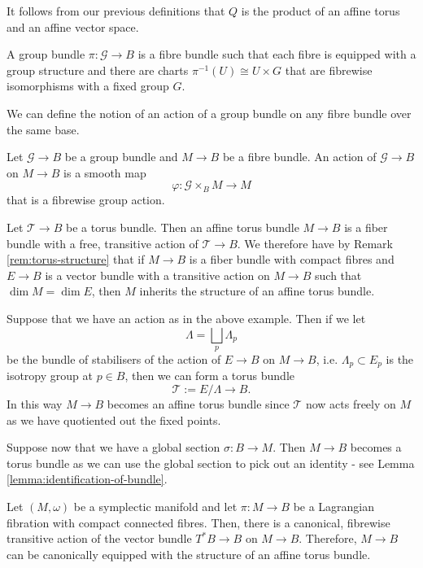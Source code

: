 \begin{remark}
    It follows from our previous definitions that $Q$ is the product of an affine torus and an affine vector space.
\end{remark}

\begin{definition}
    A group bundle $\pi : \mathcal{G} \to B$ is a fibre bundle such that each fibre is equipped with a group structure and there are charts
    $\pi^{-1}(U) \cong U \times G$ that are fibrewise isomorphisms with a fixed group $G$.
\end{definition}
We can define the notion of an action of a group bundle on any fibre bundle over the same base.

\begin{definition}
    Let $\mathcal{G} \to B$ be a group bundle and $M \to B$ be a fibre bundle. An action of $\mathcal{G} \to B$ on $M \to B$ is a smooth map
    $$\varphi : \mathcal{G} \times_B M \to M$$
    that is a fibrewise group action.
\end{definition}

\begin{eg}
    Let $\mathcal{T} \to B$ be a torus bundle. Then an affine torus bundle $M \to B$ is a fiber bundle
    with a free, transitive action of $\mathcal{T} \to B$. We therefore have by Remark \ref{rem:torus-structure} that if $M \to B$ is a fiber bundle with compact
    fibres and $E \to B$ is a vector bundle with a transitive action on $M \to B$ such that $\dim M = \dim E$, then $M$ inherits the structure of an affine torus
    bundle.
\end{eg}

Suppose that we have an action as in the above example. Then if we let \[\Lambda
    = \bigsqcup_p \Lambda_p\]
be the bundle of stabilisers of the action of $E \to B$ on $M \to B$, i.e.
$\Lambda_p\subset E_p$ is the isotropy group at $p \in B$, then we can form a
torus bundle $$ \mathcal{T} := E/\Lambda \to B. $$ In this way $M \to B$
becomes an affine torus bundle since $\mathcal{T}$ now acts freely on $M$ as we
have quotiented out the fixed points.

Suppose now that we have a global section $\sigma: B \to M$. Then $M \to B$
becomes a torus bundle as we can use the global section to pick out an identity
- see Lemma \ref{lemma:identification-of-bundle}.

\begin{theorem} \label{thm:cotangent-action}
    Let $(M, \omega)$ be a symplectic manifold and let $\pi: M \to B$ be a Lagrangian fibration with compact connected fibres.
    Then, there is a canonical, fibrewise transitive action of the vector bundle $T^*B \to B$ on $M \to B$. Therefore, $M \to B$ can be canonically equipped with
    the structure of an affine torus bundle.
\end{theorem}

